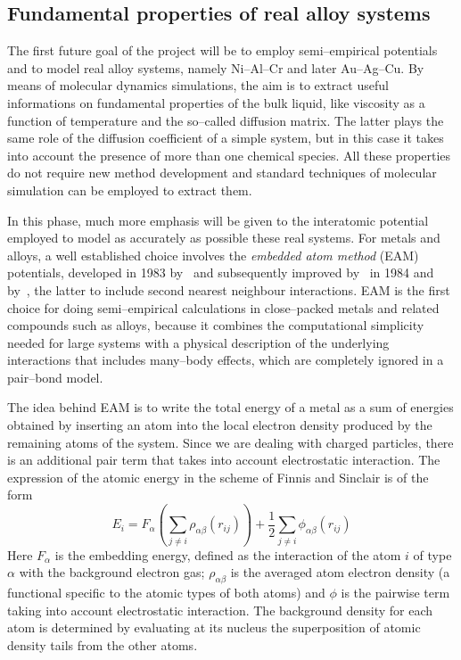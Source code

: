 \subsection{Fundamental properties of real alloy systems}
The first future goal of the project will be to employ semi--empirical potentials and to model real alloy systems, namely Ni--Al--Cr and later Au--Ag--Cu. By means of molecular dynamics simulations, the aim is to extract useful informations on fundamental properties of the bulk liquid, like viscosity as a function of temperature and the so--called diffusion matrix. The latter plays the same role of the diffusion coefficient of a simple system, but in this case it takes into account the presence of more than one chemical species. All these properties do not require new method development and standard techniques of molecular simulation can be employed to extract them.

In this phase, much more emphasis will be given to the interatomic potential employed to model as accurately as possible these real systems. For metals and alloys, a well established choice involves the \textit{embedded atom method} (EAM) potentials, developed in 1983 by~\textcite{Daw1983EAM,Daw1984EAM} and subsequently improved by~\textcite{Finnis1984EAM} in 1984 and by~\textcite{Lee2000}, the latter to include second nearest neighbour interactions. EAM is the first choice for doing semi--empirical calculations in close--packed metals and related compounds such as alloys, because it combines the computational simplicity needed for large systems with a physical description of the underlying interactions that includes many--body effects, which are completely ignored in a pair--bond model.

The idea behind EAM is to write the total energy of a metal as a sum of energies obtained by inserting an atom into the local electron density produced by the remaining atoms of the system. Since we are dealing with charged particles, there is an additional pair term that takes into account electrostatic interaction. The expression of the atomic energy in the scheme of Finnis and Sinclair is of the form
\begin{equation}
    \label{eqn:EAM1}
    E_i= F_\alpha\left(\sum_{j\neq i} \rho_{\alpha\beta} (r_{ij}) \right) + \frac{1}{2} \sum_{j\neq i} \phi_{\alpha\beta}(r_{ij})
\end{equation}
Here $F_\alpha$ is the embedding energy, defined as the interaction of the atom $i$ of type $\alpha$ with the background electron gas; $\rho_{\alpha\beta}$ is the averaged atom electron density (a functional specific to the atomic types of both atoms) and $\phi$ is the pairwise term taking into account electrostatic interaction. The background density for each atom is determined by evaluating at its nucleus the superposition of atomic density tails from the other atoms.

